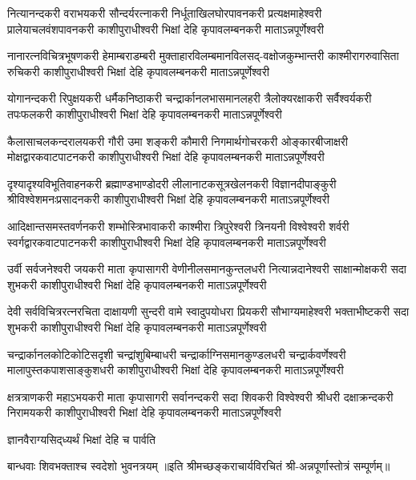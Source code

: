 
\fourlineindentedshloka
{नित्यानन्दकरी वराभयकरी सौन्दर्यरत्नाकरी}
{निर्धूताखिलघोरपावनकरी प्रत्यक्षमाहेश्वरी}
{प्रालेयाचलवंशपावनकरी काशीपुराधीश्वरी}
{भिक्षां देहि कृपावलम्बनकरी माताऽन्नपूर्णेश्वरी}

\fourlineindentedshloka
{नानारत्नविचित्रभूषणकरी हेमाम्बराडम्बरी}
{मुक्ताहारविलम्बमानविलसद्-वक्षोजकुम्भान्तरी}
{काश्मीरागरुवासिता रुचिकरी काशीपुराधीश्वरी}
{भिक्षां देहि कृपावलम्बनकरी माताऽन्नपूर्णेश्वरी}

\fourlineindentedshloka
{योगानन्दकरी रिपुक्षयकरी धर्मैकनिष्ठाकरी}
{चन्द्रार्कानलभासमानलहरी त्रैलोक्यरक्षाकरी}
{सर्वैश्वर्यकरी तपःफलकरी काशीपुराधीश्वरी}
{भिक्षां देहि कृपावलम्बनकरी माताऽन्नपूर्णेश्वरी}

\fourlineindentedshloka
{कैलासाचलकन्दरालयकरी गौरी उमा शङ्करी}
{कौमारी निगमार्थगोचरकरी ओङ्कारबीजाक्षरी}
{मोक्षद्वारकवाटपाटनकरी काशीपुराधीश्वरी}
{भिक्षां देहि कृपावलम्बनकरी माताऽन्नपूर्णेश्वरी}

\fourlineindentedshloka
{दृश्यादृश्यविभूतिवाहनकरी ब्रह्माण्डभाण्डोदरी}
{लीलानाटकसूत्रखेलनकरी विज्ञानदीपाङ्कुरी}
{श्रीविश्वेशमनःप्रसादनकरी काशीपुराधीश्वरी}
{भिक्षां देहि कृपावलम्बनकरी माताऽन्नपूर्णेश्वरी}

\fourlineindentedshloka
{आदिक्षान्तसमस्तवर्णनकरी शम्भोस्त्रिभावाकरी}
{काश्मीरा त्रिपुरेश्वरी त्रिनयनी विश्वेश्वरी शर्वरी}
{स्वर्गद्वारकवाटपाटनकरी काशीपुराधीश्वरी}
{भिक्षां देहि कृपावलम्बनकरी माताऽन्नपूर्णेश्वरी}

\fourlineindentedshloka
{उर्वी सर्वजनेश्वरी जयकरी माता कृपासागरी}
{वेणीनीलसमानकुन्तलधरी नित्यान्नदानेश्वरी}
{साक्षान्मोक्षकरी सदा शुभकरी काशीपुराधीश्वरी}
{भिक्षां देहि कृपावलम्बनकरी माताऽन्नपूर्णेश्वरी}

\fourlineindentedshloka
{देवी सर्वविचित्ररत्नरचिता दाक्षायणी सुन्दरी}
{वामे स्वादुपयोधरा प्रियकरी सौभाग्यमाहेश्वरी}
{भक्ताभीष्टकरी सदा शुभकरी काशीपुराधीश्वरी}
{भिक्षां देहि कृपावलम्बनकरी माताऽन्नपूर्णेश्वरी}

\fourlineindentedshloka
{चन्द्रार्कानलकोटिकोटिसदृशी चन्द्रांशुबिम्बाधरी}
{चन्द्रार्काग्निसमानकुण्डलधरी चन्द्रार्कवर्णेश्वरी}
{मालापुस्तकपाशसाङ्कुशधरी काशीपुराधीश्वरी}
{भिक्षां देहि कृपावलम्बनकरी माताऽन्नपूर्णेश्वरी}

\fourlineindentedshloka
{क्षत्रत्राणकरी महाऽभयकरी माता कृपासागरी}
{सर्वानन्दकरी सदा शिवकरी विश्वेश्वरी श्रीधरी}
{दक्षाक्रन्दकरी निरामयकरी काशीपुराधीश्वरी}
{भिक्षां देहि कृपावलम्बनकरी माताऽन्नपूर्णेश्वरी}

{ज्ञानवैराग्यसिद्‌ध्यर्थं भिक्षां देहि च पार्वति}

{बान्धवाः शिवभक्ताश्च स्वदेशो भुवनत्रयम्}
॥इति  श्रीमच्छङ्कराचार्यविरचितं श्री-अन्नपूर्णास्तोत्रं सम्पूर्णम्॥